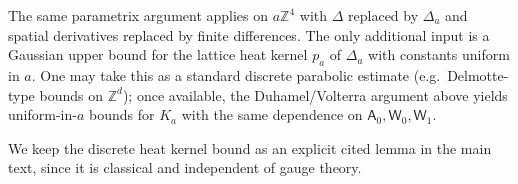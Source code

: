 The same parametrix argument applies on $a\mathbb Z^4$ with $\Delta$ replaced by $\Delta_a$ and spatial derivatives replaced by finite differences.
The only additional input is a Gaussian upper bound for the lattice heat kernel $p_a$ of $\Delta_a$ with constants uniform in $a$.
One may take this as a standard discrete parabolic estimate (e.g.\ Delmotte-type bounds on $\mathbb Z^d$); once available,
the Duhamel/Volterra argument above yields uniform-in-$a$ bounds for $K_a$ with the same dependence on
$\mathsf A_0,\mathsf W_0,\mathsf W_1$.

We keep the discrete heat kernel bound as an explicit cited lemma in the main text, since it is classical and independent of gauge theory.
